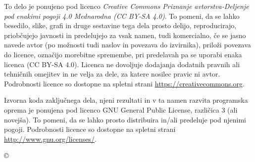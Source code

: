 \thispagestyle{empty}
\vspace*{\fill}
{\noindent\footnotesize


\vspace*{5cm}
{\small \noindent
To delo je ponujeno pod licenco \textit{Creative Commons Priznanje avtorstva-Deljenje pod enakimi pogoji 4.0 Mednarodna (CC BY-SA 4.0)}.
To pomeni, da se lahko besedilo, slike, grafi in druge sestavine tega dela prosto delijo, reproducirajo, priobčujejo javnosti in predelujejo za vsak namen, tudi komercialno, če se jasno navede avtor (po možnosti tudi naslov in povezava do izvirnika), priloži povezava do licence, označijo morebitne spremembe, pri predelavah pa se uporabi enaka licenca (CC BY-SA 4.0). Licenca ne dovoljuje dodajanja dodatnih pravnih ali tehničnih omejitev in ne velja za dele, za katere nosilec pravic ni avtor.
Podrobnosti licence so dostopne na spletni strani \url{https://creativecommons.org}.

\begin{center}%
\hspace*{1ex}\hspace*{1ex}%
\end{center}
}

\vspace*{1.5cm}
{\small \noindent
Izvorna koda zaključnega dela, njeni rezultati in v ta namen razvita programska oprema je ponujena pod licenco GNU General Public License,
različica 3 (ali novejša). To pomeni, da se lahko prosto distribuira in/ali predeluje pod njenimi pogoji.
Podrobnosti licence so dostopne na spletni strani \url{http://www.gnu.org/licenses/}.
}


}
\begin{center}
{\footnotesize{\sc \copyright \myyear\ \tauthor}}
\end{center} 
